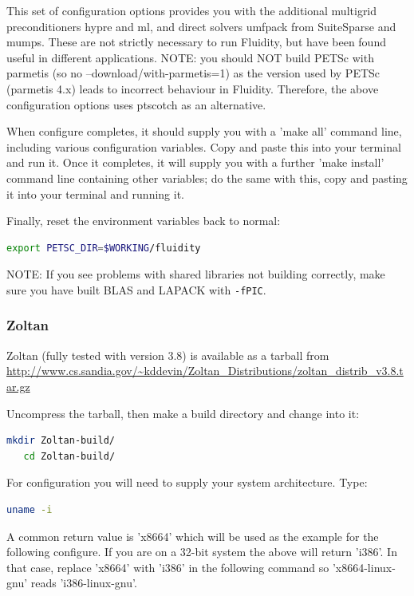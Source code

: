 This set of configuration options provides you with the additional
multigrid preconditioners hypre and ml, and direct solvers umfpack
from SuiteSparse and mumps. These are not strictly necessary to run
Fluidity, but have been found useful in different applications. NOTE:
you should NOT build PETSc with parmetis
(so no --download/with-parmetis=1) as the version used by PETSc
(parmetis 4.x) leads to incorrect behaviour in Fluidity. Therefore, the above
configuration options uses ptscotch as an alternative.

When configure completes, it should supply you with a 'make all' command line,
including various configuration variables. Copy and paste this into your
terminal and run it. Once it completes, it will supply you with a further 'make
install' command line containing other variables; do the same with this, copy
and pasting it into your terminal and running it.

Finally, reset the environment variables back to normal:

\begin{lstlisting}[language=bash]
export PETSC_DIR=$WORKING/fluidity
\end{lstlisting}

NOTE: If you see problems with shared libraries not building correctly, make
sure you have built BLAS and LAPACK with \lstinline[language=bash]+-fPIC+.

\subsubsection{Zoltan}
\label{sec:required_libraries_numerical_zoltan}

Zoltan (fully tested with version 3.8) is available as a tarball from
\url{http://www.cs.sandia.gov/~kddevin/Zoltan_Distributions/zoltan_distrib_v3.8.tar.gz}

Uncompress the tarball, then make a build directory and change into it:

\begin{lstlisting}[language=bash]
   mkdir Zoltan-build/
   cd Zoltan-build/
\end{lstlisting}

For configuration you will need to supply your system architecture. Type:

\begin{lstlisting}[language=bash]
   uname -i
\end{lstlisting}

A common return value is 'x86{\textunderscore}64' which will be used as the
example for the following configure. If you are on a 32-bit system the above
will return 'i386'. In that case, replace 'x86{\textunderscore}64' with 'i386' in
the following command so 'x86{\textunderscore}64-linux-gnu' reads
'i386-linux-gnu'.

